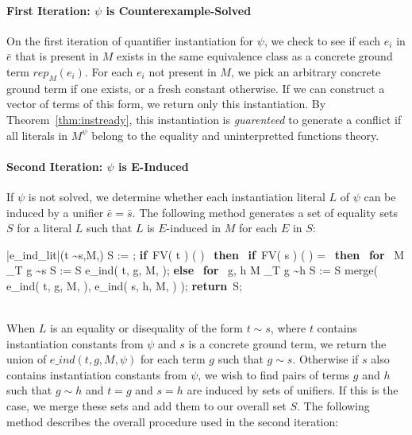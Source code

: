 \documentclass{llncs}
\def\IF{\qtab\keyword{if}\ }
\def\THEN{\ \keyword{then}\ }
\def\ELSE{\untab\qtab\keyword{else}\ }
\def\FI{\untab}
\def\RETURN{\keyword{return}\ }
\def\ENDPROC{\untab}
\def\DOFOR{\qtab\keyword{for}\ }
\def\ENDFOR{\untab}
\def\keyword#1{\mbox{\normalshape\bf #1}}
\begin{document}
\paragraph{First Iteration: $\psi$ is Counterexample-Solved}

On the first iteration of quantifier instantiation for $\psi$, we check to see if each $e_i$ in $\bar{e}$ that is present in $M$ exists in the same equivalence class as a concrete ground term $rep_M(e_i)$.
For each $e_i$ not present in $M$, we pick an arbitrary concrete ground term if one exists, or a fresh constant otherwise.
If we can construct a vector of terms of this form, we return only this instantiation.
By Theorem~\ref{thm:instready}, this instantiation is \emph{guarenteed} to generate a conflict if all literals in $M^\psi$ belong to the equality and uninterpretted functions theory.

\paragraph{Second Iteration: $\psi$ is E-Induced}

If $\psi$ is not solved, we determine whether each instantiation literal $L$ of $\psi$ can be induced by a unifier $\bar{e} = \bar{s}$.
The following method generates a set of equality sets $S$ for a literal $L$ such that $L$ is $E$-induced in $M$ for each $E$ in $S$:

\begin{minipage}[t]{.4\linewidth}
\begin{program}
\PROC |e\_ind\_lit|(t \sim s,M,\psi) \BODY
  S := \emptyset;
  \IF FV( t ) \cap {}( \psi ) \neq \emptyset \THEN
    \IF FV( s ) \cap {}( \psi ) = \emptyset \THEN
      \DOFOR {} M \models_T g \sim s
        S := S \cup e\_ind( t, g, M, \psi );
      \ENDFOR
    \ELSE
      \DOFOR {} g, h  M \models_T g \sim h
        S := S \cup merge( e\_ind( t, g, M, \psi ), e\_ind( s, h, M, \psi ) );
      \ENDFOR 
    \FI
  \FI
  \RETURN S;
\ENDPROC
\end{program}
\end{minipage}

\ \\

When $L$ is an equality or disequality of the form $t \sim s$, where $t$ contains instantiation constants from $\psi$ and $s$ is a concrete ground term, we return the union of $e\_ind( t, g, M, \psi )$ for each term $g$ such that $g \sim s$.
Otherwise if $s$ also contains instantiation constants from $\psi$, we wish to find pairs of terms $g$ and $h$ such that $g \sim h$ and $t = g$ and $s = h$ are induced by sets of unifiers.
If this is the case, we merge these sets and add them to our overall set $S$.
The following method describes the overall procedure used in the second iteration:
\end{document}
